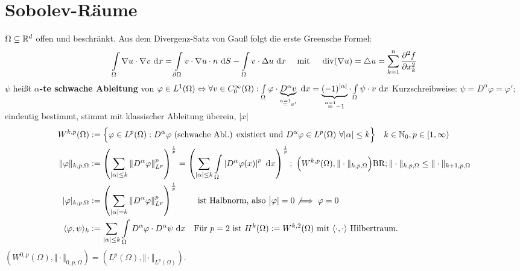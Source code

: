 \documentclass[12pt]{scrartcl}
\begin{document}
	\section{Sobolev-Räume}
	
	$\Omega\subseteq\mathbb{R}^d$ offen und beschränkt.
	Aus dem Divergenz-Satz von Gauß folgt die erste Greensche Formel:
	\begin{align}\label{eqGreen}
		\int\limits_\Omega\nabla u\cdot\nabla v\text{ d} x
		=\int\limits_{\partial\Omega}v\cdot\nabla u\cdot n\text{ d} S-\int\limits_\Omega v\cdot\Delta u\text{ d} x\quad\text{ mit }\quad
		\operatorname{div}(\nabla u)=\triangle u=\sum\limits_{k=1}^n\frac{\partial^2 f}{\partial x_k^2}
	\end{align}
	$\psi$ heißt \textbf{$\alpha$-te schwache Ableitung} von $\varphi\in L^1(\Omega)\Leftrightarrow
		\forall v\in C_0^\infty(\Omega):\int\limits_\Omega\varphi\cdot \underbrace{D^\alpha v}_{\overset{\alpha=1}=v'}\text{ d} x
		=\underbrace{(-1)^{|\alpha|}}_{\overset{\alpha=1}{=}-1}\cdot\int\limits_\Omega\psi\cdot v\text{ d} x$
	Kurzschreibweise: $\psi=D^\alpha\varphi=\varphi'$; eindeutig bestimmt, stimmt mit klassischer Ableitung überein, $|x|$
	\begin{align*}
		W^{k,p}(\Omega)
		&:=\Big\lbrace\varphi\in L^p(\Omega):D^\alpha\varphi\text{ (schwache Abl.) existiert und }D^\alpha\varphi\in L^p(\Omega)~\forall|\alpha|\leq k\Big\rbrace
		\quad k\in\mathbb{N}_0,p\in[1,\infty)\\
		\Vert\varphi\Vert_{k,p,\Omega}
		&:=\left(\sum\limits_{|\alpha|\leq k}\left\Vert D^\alpha\varphi\right\Vert^p_{L^p}\right)^{\frac{1}{p}}
		=\left(\sum\limits_{|\alpha|\leq k}\int\limits_\Omega\left| D^\alpha\varphi(x)\right|^p\text{ d} x\right)^{\frac{1}{p}};~\Big(W^{k,p}(\Omega),\Vert\cdot\Vert_{k,p,\Omega}\Big)\text{BR};\Vert\cdot\Vert_{k,p,\Omega}\leq\Vert\cdot\Vert_{k+1,p,\Omega}\\
		|\varphi|_{k,p,\Omega}
		&:=\left(\sum\limits_{|\alpha|= k}\left\Vert D^\alpha\varphi\right\Vert^p_{L^p}\right)^{\frac{1}{p}}\qquad\text{ ist Halbnorm, also }\big|\varphi|=0\not\implies\varphi=0\\
		\langle \varphi,\psi\rangle_k&:=\sum\limits_{|\alpha|\leq k}\int\limits_\Omega D^\alpha\varphi\cdot D^\alpha\psi\text{ d} x\quad\text{Für $p=2$ ist $H^k(\Omega):=W^{k,2}(\Omega)$ mit $\langle\cdot,\cdot\rangle$ Hilbertraum.}
	\end{align*}
	$(W^{0,p}(\Omega),\Vert\cdot\Vert_{0,p,\Omega})=(L^p(\Omega),\Vert\cdot\Vert_{L^p(\Omega)})$.\\
\end{document}

